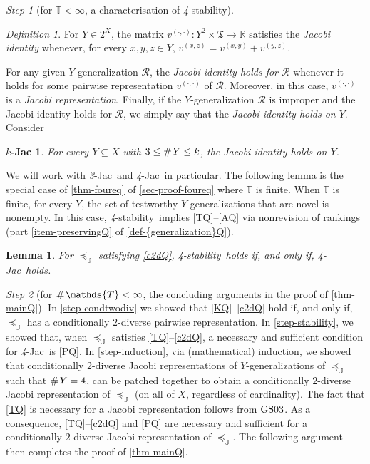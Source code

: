 \documentclass[ecta,nameyear,draft]{econsocart}
\newcommand{\countof}{\mathbin{\#}\hskip1pt}
\newcommand{\R}{\mathbb R}
\newcommand{\mc}{\mathcal}
\newcommand{\ext}{\mathrel{\mc R}}
\newcommand{\mbbt}{{\mathds {T}}}
\newcommand{\mbbtpp}{{\mathfrak{T}}}
\newcommand{\mbbj}{\mathds J}
\newcommand{\xy}{{(x, y)}}
\newcommand{\yz}{{(y,z)}}
\newcommand{\xz}{{(x,z)}}
\newcommand{\dd}{{(\cdot,\cdot)}}
\newcommand{\stability}{\textit{4}-\textup{{stability}}}
\newcommand{\fourjac}{\textup{\textit{4}-Jac}}
\newcommand{\threejac}{\textup{\textit{3}-Jac}}
\newcommand{\gsii}{$\textup{GS03}$}
\theoremstyle{plain}
\newtheorem{lemma}{Lemma}[theorem]
\newtheorem*{k-jac*}{$k$-Jac}
\theoremstyle{remark}
\newtheorem{step}{Step}[section]
\newtheorem*{definition*}{Definition}
\begin{document}
\begin{appendix}
\begin{step}[for $\mbbt<\infty$, a characterisation of
    \stability]
\begin{definition*}
    For $Y \in 2^{X}$, the matrix
    $v^{\dd} : Y^{2}\times \mbbtpp \rightarrow \R$ satisfies the \emph{Jacobi
      identity} whenever, for every $x , y , z \in Y$,
    $v^{\xz} = v^{\xy} + v^{\yz}$.
  \end{definition*}
  For any given $Y$-{generalization} $\ext$, the \emph{Jacobi identity holds for
    $\ext$} whenever it holds for some pairwise representation $v^{\dd}$ of
  $\ext$. Moreover, in this case, $v^{\dd}$ is a \emph{Jacobi
    representation}. Finally, if the $Y$-{generalization} $\ext$ is improper and the
  Jacobi identity holds for $\ext$, we simply say that the \emph{Jacobi identity
    holds on $Y$}.  Consider
  \begin{k-jac*}
  
    For every $Y \subseteq X$ with $3 \leq \countof Y \leq k$, the Jacobi
    identity holds on $Y$.
     
  \end{k-jac*}
  We will work with \threejac\ and \fourjac\ in particular. The following lemma is
  the special case of \cref{thm-foureq} of \cref{sec-proof-foureq} where $\mbbt$
  is finite. When $\mbbt$ is finite, for every $Y$, the set of testworthy
  $Y$-{generalization}s that are novel is nonempty. In this case, \stability\ implies
  \ref{TQ}--\ref{AQ} via nonrevision of rankings (part \ref{item-preservingQ}  of
  \cref{def-{generalization}Q}).
   \begin{lemma}\label{lem-foureq}
     For $\preceq_{\mbbj}$ satisfying \ref{c2dQ}, \stability\ holds if, and only if,
     \fourjac\ holds.
   \end{lemma}
   \end{step}
  \setcounter{step}{3}
  
  \begin{step}[for $\countof \mbbt < \infty$, the concluding arguments in the
    proof of
    \cref{thm-mainQ}]\label{step-conc-mainQ} In \cref{step-condtwodiv} we showed
    that \ref{KQ}–\ref{c2dQ} hold if, and only if, $\preceq_{\mbbj}$ has a
    conditionally $2$-diverse pairwise representation.  In \cref{step-stability},
    we showed that, when $\preceq_{\mbbj}$ satisfies \ref{TQ}–\ref{c2dQ}, a
    necessary and sufficient condition for \fourjac\ is \ref{PQ}.  In
    \cref{step-induction}, via (mathematical) induction, we showed that
    conditionally $2$-diverse Jacobi representations of $Y$-{generalization}s of
    $\preceq_{\mbbj}$ such that $\countof Y = 4$, can be patched together to
    obtain a conditionally $2$-diverse Jacobi representation of $\preceq_{\mbbj}$
    (on all of $X$, regardless of cardinality). The fact that \ref{TQ} is
    necessary for a Jacobi representation follows from \gsii.  As a consequence,
    \ref{TQ}–\ref{c2dQ} and \ref{PQ} are necessary and sufficient for a
    conditionally $2$-diverse Jacobi representation of $\preceq_{\mbbj}$. The
    following argument then completes the proof of \cref{thm-mainQ}.
  

\end{step}
\end{appendix}
\end{document}
